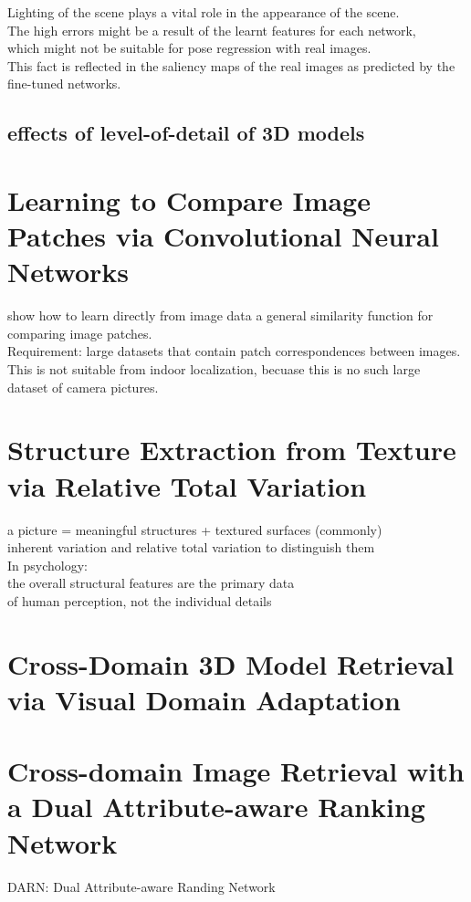 \documentclass[11pt]{article}
\begin{document}
Lighting of the scene plays a vital role in the appearance of the scene. \\

The high errors might be a result of the learnt features for each network, \\
which might not be suitable for pose regression with real images. \\
This fact is reflected in the saliency maps of the real images as predicted by the fine-tuned networks. \\

\subsection{effects of level-of-detail of 3D models}
\label{sec-5-5}
\section{Learning to Compare Image Patches via Convolutional Neural Networks}
\label{sec-6}
show how to learn directly from image data a general similarity function for comparing image patches. \\

Requirement: large datasets that contain patch correspondences between images. \\
This is not suitable from indoor localization, becuase this is no such large \\
dataset of camera pictures. \\
\section{Structure Extraction from Texture via Relative Total Variation}
\label{sec-7}
a picture = meaningful structures + textured surfaces (commonly) \\

inherent variation and relative total variation to distinguish them \\

In psychology: \\
the overall structural features are the primary data \\
of human perception, not the individual details \\
\section{Cross-Domain 3D Model Retrieval via Visual Domain Adaptation}
\label{sec-8}
\section{Cross-domain Image Retrieval with a Dual Attribute-aware Ranking Network}
\label{sec-9}
DARN: Dual Attribute-aware Randing Network \\
\end{document}
